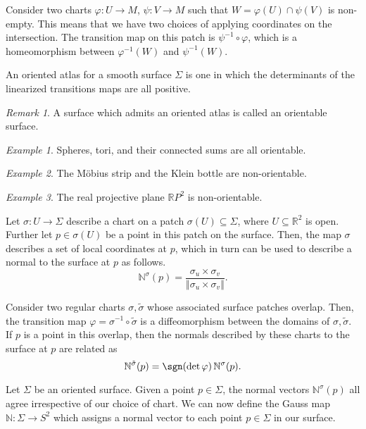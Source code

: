 \documentclass[11pt]{article}
\newcommand{\R}{\mathbb{R}}
\newcommand{\N}{\mathbb{N}}
\newcommand{\norm}[1]{\Vert #1 \Vert}
\theoremstyle{definition}
\theoremstyle{remark}
\newtheorem*{remark}{Remark}
\newtheorem*{example}{Example}
\numberwithin{equation}{section}
\begin{document}
    \begin{definition}
        Consider two charts $\varphi\colon U \to M$, $\psi\colon V \to M$ such that
        $W = \varphi(U) \cap \psi(V)$ is non-empty. This means that we have two
        choices of applying coordinates on the intersection. The transition map on
        this patch is $\psi^{-1}\circ \varphi$, which is a homeomorphism between
        $\varphi^{-1}(W)$ and $\psi^{-1}(W)$.
    \end{definition}

    \begin{definition}
        An oriented atlas for a smooth surface $\Sigma$ is one in which the
        determinants of the linearized transitions maps are all positive.
        \begin{remark}
            A surface which admits an oriented atlas is called an orientable surface.
        \end{remark}
    \end{definition}

    \begin{example}
        Spheres, tori, and their connected sums are all orientable.
    \end{example}
    \begin{example}
        The M\"obius strip and the Klein bottle are non-orientable.
    \end{example}
    \begin{example}
        The real projective plane $\R P^2$ is non-orientable.
    \end{example}

    \begin{definition}
        Let $\sigma\colon U \to \Sigma$ describe a chart on a patch $\sigma(U)
        \subseteq \Sigma$, where $U \subseteq \R^2$ is open. Further let $p \in
        \sigma(U)$ be a point in this patch on the surface. Then, the map $\sigma$
        describes a set of local coordinates at $p$, which in turn can be used to
        describe a normal to the surface at $p$ as follows. \[
            \N^\sigma(p) = \frac{\sigma_u\times \sigma_v}{\norm{\sigma_u \times
            \sigma_v}}.
        \]
    \end{definition}

    \begin{lemma}
        Consider two regular charts $\sigma, \tilde{\sigma}$ whose associated surface
        patches overlap. Then, the transition map $\varphi = \sigma^{-1}\circ
        \tilde{\sigma}$ is a diffeomorphism between the domains of $\sigma,
        \tilde{\sigma}$. If $p$ is a point in this overlap, then the normals
        described by these charts to the surface at $p$ are related as \[
            \N^{\tilde{\sigma}}(p) = \sgn(\det{\varphi})\, \N^{\sigma}(p).
        \]       
    \end{lemma}

    \begin{definition}
        Let $\Sigma$ be an oriented surface. Given a point $p \in \Sigma$, the normal
        vectors $\N^\sigma(p)$ all agree irrespective of our choice of chart. We can
        now define the Gauss map $\N\colon \Sigma \to S^2$ which assigns a normal
        vector to each point $p \in \Sigma$ in our surface.
    \end{definition}
\end{document}
